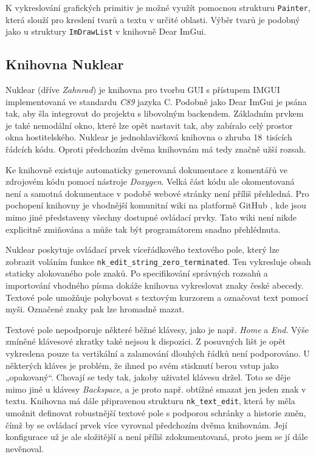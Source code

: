 \documentclass[FM,DP]{tulthesis}
\begin{document}
	K vykreslování grafických primitiv je možné využít pomocnou strukturu \texttt{Painter}, která slouží pro kreslení tvarů a textu v určité oblasti. Výběr tvarů je podobný jako u struktury \texttt{ImDrawList} v knihovně Dear ImGui.
	
	\subsection{Knihovna Nuklear}
	
	Nuklear (dříve \textit{Zahnrad}) \cite{online_nuklearwiki} je knihovna pro tvorbu GUI s přístupem IMGUI implementovaná ve standardu \textit{C89} jazyka C. Podobně jako Dear ImGui je psána tak, aby šla integrovat do projektu s libovolným backendem. Základním prvkem je také nemodální okno, které lze opět nastavit tak, aby zabíralo celý prostor okna hostitelského. Nuklear je jednohlavičková knihovna o zhruba 18~tisících řádcích kódu. Oproti předchozím dvěma knihovnám má tedy značně užší rozsah.
	
	Ke knihovně existuje automaticky generovaná dokumentace z komentářů ve zdrojovém kódu pomocí nástroje \textit{Doxygen}. Velká část kódu ale okomentovaná není a samotná dokumentace v podobě webové stránky není příliš přehledná. Pro pochopení knihovny je vhodnější komunitní wiki na platformě GitHub \cite{online_nuklearwiki}, kde jsou mimo jiné představeny všechny dostupné ovládací prvky. Tato wiki není nikde explicitně zmiňována a může tak být programátorem snadno přehlédnuta.
	
	Nuklear poskytuje ovládací prvek víceřádkového textového pole, který lze zobrazit voláním funkce \texttt{nk\_edit\_string\_zero\_terminated}. Ten vykresluje obsah staticky alokovaného pole znaků. Po specifikování správných rozsahů a importování vhodného písma dokáže knihovna vykreslovat znaky české abecedy. Textové pole umožňuje pohybovat s textovým kurzorem a označovat text pomocí myši. Označené znaky pak lze hromadně mazat.
	
	Textové pole nepodporuje některé běžné klávesy, jako je např. \textit{Home} a \textit{End}. Výše zmíněné klávesové zkratky také nejsou k dispozici. Z posuvných lišt je opět vykreslena pouze ta vertikální a zalamování dlouhých řádků není podporováno. U některých kláves je problém, že ihned po svém stisknutí berou vstup jako „opakovaný“. Chovají se tedy tak, jakoby uživatel klávesu držel. Toto se děje mimo jiné u klávesy \textit{Backspace}, a je proto např. obtížné smazat jen jeden znak v textu.	Knihovna má dále připravenou strukturu \texttt{nk\_text\_edit}, která by měla umožnit definovat robustnější textové pole s podporou schránky a historie změn, čímž by se ovládací prvek více vyrovnal předchozím dvěma knihovnám. Její konfigurace už je ale složitější a není příliš zdokumentovaná, proto jsem se jí dále nevěnoval.
	
\end{document}
